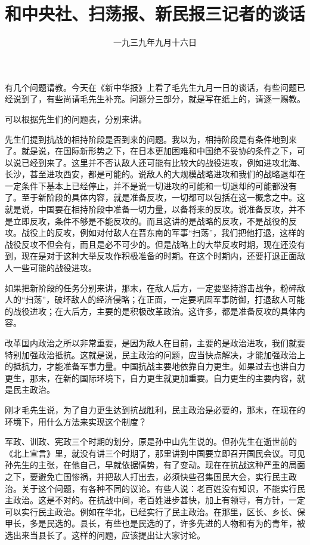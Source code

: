 
\title{和中央社、扫荡报、新民报三记者的谈话}
\date{一九三九年九月十六日}
\maketitle


有几个问题请教。今天在《新中华报》上看了毛先生九月一日的谈话，有些问题已经说到了，有些尚请毛先生补充。问题分三部分，就是写在纸上的，请逐一赐教。

可以根据先生们的问题表，分别来讲。

先生们提到抗战的相持阶段是否到来的问题。我以为，相持阶段是有条件地到来了。就是说，在国际新形势之下，在日本更加困难和中国绝不妥协的条件之下，可以说已经到来了。这里并不否认敌人还可能有比较大的战役进攻，例如进攻北海、长沙，甚至进攻西安，都是可能的。说敌人的大规模战略进攻和我们的战略退却在一定条件下基本上已经停止，并不是说一切进攻的可能和一切退却的可能都没有了。至于新阶段的具体内容，就是准备反攻，一切都可以包括在这一概念之中。这就是说，中国要在相持阶段中准备一切力量，以备将来的反攻。说准备反攻，并不是立即反攻，条件不够是不能反攻的。而且这讲的是战略的反攻，不是战役的反攻。战役上的反攻，例如对付敌人在晋东南的军事“扫荡”，我们把他打退，这样的战役反攻不但会有，而且是必不可少的。但是战略上的大举反攻时期，现在还没有到，现在是对于这种大举反攻作积极准备的时期。在这个时期内，还要打退正面敌人一些可能的战役进攻。

如果把新阶段的任务分别来讲，那末，在敌人后方，一定要坚持游击战争，粉碎敌人的“扫荡”，破坏敌人的经济侵略；在正面，一定要巩固军事防御，打退敌人可能的战役进攻；在大后方，主要的是积极改革政治。这许多，都是准备反攻的具体内容。

改革国内政治之所以非常重要，是因为敌人在目前，主要的是政治进攻，我们就要特别加强政治抵抗。这就是说，民主政治的问题，应当快点解决，才能加强政治上的抵抗力，才能准备军事力量。中国抗战主要地依靠自力更生。如果过去也讲自力更生，那末，在新的国际环境下，自力更生就更加重要。自力更生的主要内容，就是民主政治。

刚才毛先生说，为了自力更生达到抗战胜利，民主政治是必要的，那末，在现在的环境下，用什么方法来实现这个制度？

军政、训政、宪政三个时期的划分，原是孙中山先生说的。但孙先生在逝世前的《北上宣言》里，就没有讲三个时期了，那里讲到中国要立即召开国民会议。可见孙先生的主张，在他自己，早就依据情势，有了变动。现在在抗战这种严重的局面之下，要避免亡国惨祸，并把敌人打出去，必须快些召集国民大会，实行民主政治。关于这个问题，有各种不同的议论。有些人说：老百姓没有知识，不能实行民主政治。这是不对的。在抗战中间，老百姓进步甚快，加上有领导，有方针，一定可以实行民主政治。例如在华北，已经实行了民主政治。在那里，区长、乡长、保甲长，多是民选的。县长，有些也是民选的了，许多先进的人物和有为的青年，被选出来当县长了。这样的问题，应该提出让大家讨论。

